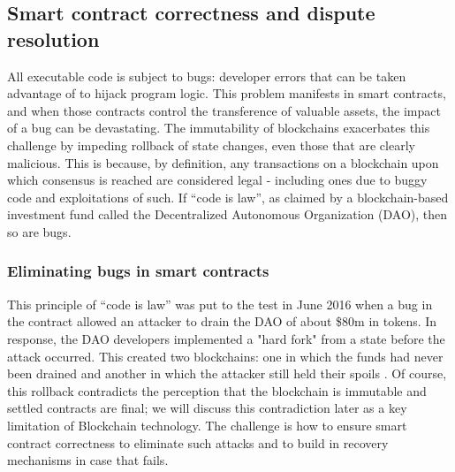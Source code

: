 \subsection{Smart contract correctness and dispute resolution}
All executable code is subject to bugs: developer errors that can be taken advantage of to hijack program logic. This problem manifests in smart contracts, and when those contracts control the transference of valuable assets, the impact of a bug can be devastating. The immutability of blockchains exacerbates this challenge by impeding rollback of state changes, even those that are clearly malicious. This is because, by definition, any transactions on a blockchain upon which consensus is reached are considered legal - including ones due to buggy code and exploitations of such. If ``code is law'', as claimed by a blockchain-based investment fund called the Decentralized Autonomous Organization (DAO), then so are bugs. 

\subsubsection{Eliminating bugs in smart contracts}
This principle of ``code is law'' was put to the test in June 2016 when a bug in the contract allowed an attacker to drain the DAO of about \$80m in tokens. 
In response, the DAO developers implemented a "hard fork" from a state before the attack occurred. This created two blockchains: one in which the funds had never been drained and another in which the attacker still held their spoils \cite{Castillo16}. Of course, this rollback contradicts the perception that the blockchain is immutable and settled contracts are final; we will discuss this contradiction later as a key limitation of Blockchain technology. The challenge is how to ensure smart contract correctness to eliminate such attacks and to build in recovery mechanisms in case that fails.

